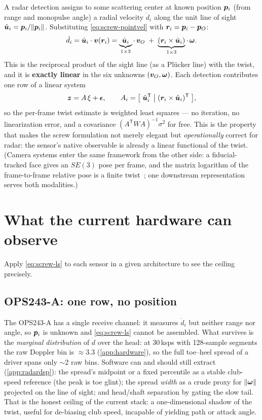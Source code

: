 A radar detection assigns to some scattering center at known position $\bm{p}_i$ (from range and monopulse angle) a radial velocity $\dot d_i$ along the unit line of sight $\hat{\bm{u}}_i = \bm{p}_i / \lVert\bm{p}_i\rVert$.
Substituting \cref{eq:screw-pointvel} with $\bm{r}_i = \bm{p}_i - \bm{p}_O$:
\begin{equation}
\label{eq:screw-doppler}
\dot d_i
= \hat{\bm{u}}_i \cdot \bm{v}(\bm{r}_i)
= \underbrace{\hat{\bm{u}}_i}_{1\times3} \cdot\, \bm{v}_O
\;+\; \underbrace{(\bm{r}_i \times \hat{\bm{u}}_i)}_{1\times3} \cdot\, \bm{\omega}.
\end{equation}
This is the reciprocal product of the sight line (as a Pl\"ucker line) with the twist, and it is \textbf{exactly linear} in the six unknowns $(\bm{v}_O, \bm{\omega})$.
Each detection contributes one row of a linear system
\begin{equation}
\label{eq:screw-ls}
\bm{z} = A\,\xi + \bm{\epsilon},
\qquad
A_i = \bigl[\; \hat{\bm{u}}_i^{\mathsf T} \;\big|\; (\bm{r}_i \times \hat{\bm{u}}_i)^{\mathsf T} \;\bigr],
\end{equation}
so the per-frame twist estimate is weighted least squares --- no iteration, no linearization error, and a covariance $(A^{\mathsf T} W A)^{-1}\sigma^2$ for free.
This is the property that makes the screw formulation not merely elegant but \emph{operationally} correct for radar: the sensor's native observable is already a linear functional of the twist.
(Camera systems enter the same framework from the other side: a fiducial-tracked face gives an $SE(3)$ pose per frame, and the matrix logarithm of the frame-to-frame relative pose is a finite twist~\cite{murrayliss}; one downstream representation serves both modalities.)

\section{What the current hardware can observe}
\label{sec:screw-ceiling}

Apply \cref{eq:screw-ls} to each sensor in a given architecture to see the ceiling precisely.

\subsection{OPS243-A: one row, no position}
The OPS243-A has a single receive channel: it measures $\dot d_i$ but neither range nor angle, so $\bm{p}_i$ is unknown and \cref{eq:screw-ls} cannot be assembled.
What survives is the \emph{marginal distribution} of $\dot d$ over the head: at 30\,ksps with 128-sample segments the raw Doppler bin is $\approx$3.3\mph{} (\cref{app:hardware}), so the full toe--heel spread of a driver spans only $\sim$2 raw bins.
Software can and should still extract (\cref{app:radardsp}): the spread's midpoint or a fixed percentile as a stable club-speed reference (the peak is toe glint); the spread \emph{width} as a crude proxy for $\lVert\bm{\omega}\rVert$ projected on the line of sight; and head/shaft separation by gating the slow tail.
That is the honest ceiling of the current stack: a one-dimensional shadow of the twist, useful for de-biasing club speed, incapable of yielding path or attack angle.

